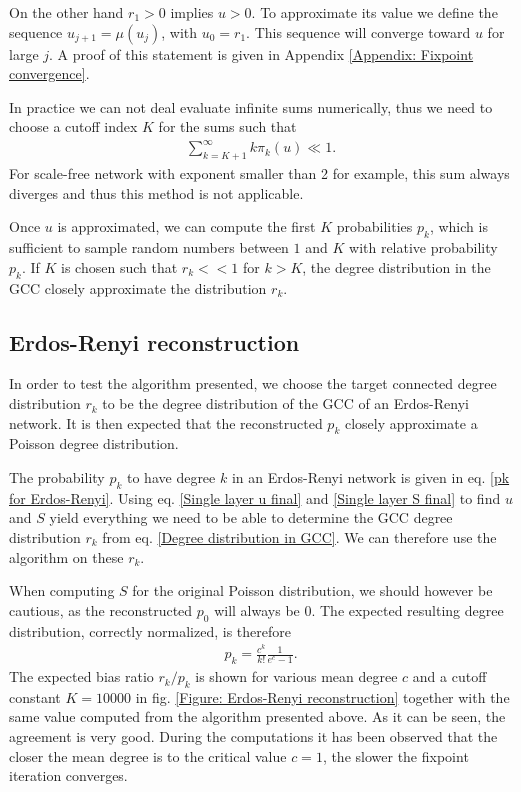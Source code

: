 \documentclass[
11pt, %
english, %
singlespacing, %
nolistspacing, %
liststotoc, %
headsepline, %
]{MastersDoctoralThesis} %
\begin{document}
On the other hand $r_1 > 0$ implies $u > 0$. To approximate its value we define the sequence $u_{j+1} = \mu(u_j)$, with $u_0 = r_1$. This sequence will converge toward $u$ for large $j$. A proof of this statement is given in Appendix \ref{Appendix: Fixpoint convergence}.

In practice we can not deal evaluate infinite sums numerically, thus we need to choose a cutoff index $K$ for the sums such that
\begin{align}
	\sum_{k=K+1}^\infty k \pi_k(u) \ll 1.
\end{align}
For scale-free network with exponent smaller than 2 for example, this sum always diverges and thus this method is not applicable.

Once $u$ is approximated, we can compute the first $K$ probabilities $p_k$, which is sufficient to sample random numbers between $1$ and $K$ with relative probability $p_k$. If $K$ is chosen such that $r_k << 1$ for $k > K$, the degree distribution in the GCC closely approximate the distribution $r_k$.

\subsection{Erdos-Renyi reconstruction}

In order to test the algorithm presented, we choose the target connected degree distribution $r_k$ to be the degree distribution of the GCC of an Erdos-Renyi network. It is then expected that the reconstructed $p_k$ closely approximate a Poisson degree distribution.

The probability $p_k$ to have degree $k$ in an Erdos-Renyi network is given in eq. \eqref{pk for Erdos-Renyi}. Using eq. \eqref{Single layer u final} and \eqref{Single layer S final} to find $u$ and $S$ yield everything we need to be able to determine the GCC degree distribution $r_k$ from eq. \eqref{Degree distribution in GCC}. We can therefore use the algorithm on these $r_k$.

When computing $S$ for the original Poisson distribution, we should however be cautious, as the reconstructed $p_0$ will always be $0$. The expected resulting degree distribution, correctly normalized, is therefore
\begin{align}
	p_k = \frac{c^k}{k!} \frac{1}{e^{c} - 1}.
\end{align}
The expected bias ratio $r_k/p_k$ is shown for various mean degree $c$ and a cutoff constant $K = 10000$ in fig. \ref{Figure: Erdos-Renyi reconstruction} together with the same value computed from the algorithm presented above. As it can be seen, the agreement is very good. During the computations it has been observed that the closer the mean degree is to the critical value $c = 1$, the slower the fixpoint iteration converges.
\end{document}
